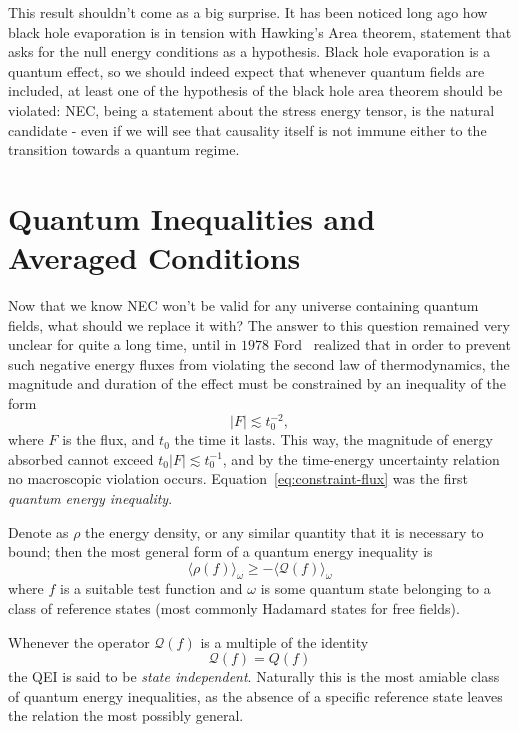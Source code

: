 This result shouldn't come as a big surprise. It has been noticed long ago how black hole evaporation is in tension with Hawking's Area theorem, statement that asks for the null energy conditions as a hypothesis. Black hole evaporation is a quantum effect, so we should indeed expect that whenever quantum fields are included, at least one of the hypothesis of the black hole area theorem should be violated: NEC, being a statement about the stress energy tensor, is the natural candidate - even if we will see that causality itself is not immune either to the transition towards a quantum regime.

\section{Quantum Inequalities and Averaged Conditions}
Now that we know NEC won't be valid for any universe containing quantum fields, what should we replace it with? The answer to this question remained very unclear for quite a long time, until in \(1978\) Ford~\cite[]{ford1978quantum} realized that in order to prevent such negative energy fluxes from violating the second law of thermodynamics, the magnitude and duration of the effect must be constrained by an inequality of the form
\begin{equation}
    \label{eq:constraint-flux}
    \vert F \vert \lesssim t_0^{-2},    
\end{equation}
where \(F\) is the flux, and \(t_0\) the time it lasts. This way, the magnitude of energy absorbed cannot exceed \(t_0\vert F\vert \lesssim t_0^{-1}\), and by the time-energy uncertainty relation no macroscopic violation occurs. Equation~\eqref{eq:constraint-flux} was the first \emph{quantum energy inequality}. 

Denote as \(\rho\) the energy density, or any similar quantity that it is necessary to bound; then the most general form of a quantum energy inequality is 
\[
\langle \rho(f) \rangle_{\omega} \ge - \langle \mathcal{Q}(f) \rangle_{\omega}   
\]
where \(f\) is a suitable test function and \(\omega\) is some quantum state belonging to a class of reference states (most commonly Hadamard states for free fields).

Whenever the operator \(\mathcal{Q}(f) \) is a multiple of the identity 
\[
    \mathcal{Q}(f) = Q(f)    
\]
the QEI is said to be \emph{state independent}. Naturally this is the most amiable class of quantum energy inequalities, as the absence of a specific reference state leaves the relation the most possibly general.

